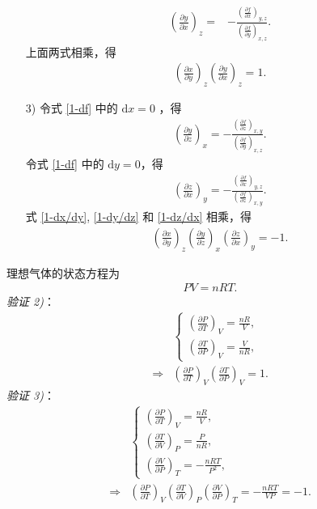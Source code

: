\documentclass{assignment}
\begin{document}
\begin{pf}
\begin{itemize}
\begin{align}
            \left(\frac{\partial y}{\partial x}\right)_z=&-\frac{\left(\frac{\partial f}{\partial x}\right)_{y,z}}{\left(\frac{\partial f}{\partial y}\right)_{x,z}}.
        \end{align}
        上面两式相乘，得
        \begin{align}
            \left(\frac{\partial x}{\partial y}\right)_z\left(\frac{\partial y}{\partial x}\right)_z=1.
        \end{align}
        \item[3)] 令式 \eqref{1-df} 中的 $\mathrm{d}x=0$ ，得
        \begin{align}
            \label{1-dy/dz}
            \left(\frac{\partial y}{\partial z}\right)_x=-\frac{\left(\frac{\partial f}{\partial z}\right)_{x,y}}{\left(\frac{\partial f}{\partial y}\right)_{x,z}}.
        \end{align}
        令式 \eqref{1-df} 中的 $\mathrm{d}y=0$，得
        \begin{align}
            \label{1-dz/dx}
            \left(\frac{\partial z}{\partial x}\right)_y=-\frac{\left(\frac{\partial f}{\partial x}\right)_{y,z}}{\left(\frac{\partial f}{\partial z}\right)_{x,y}}.
        \end{align}
        式 \eqref{1-dx/dy}, \eqref{1-dy/dz} 和 \eqref{1-dz/dx} 相乘，得
        \begin{align}
            \left(\frac{\partial x}{\partial y}\right)_z\left(\frac{\partial y}{\partial z}\right)_x\left(\frac{\partial z}{\partial x}\right)_y=-1.
        \end{align}
    \end{itemize}

    理想气体的状态方程为
    \begin{align}
        PV=nRT.
    \end{align}
    \emph{验证 2)}：
    \begin{align}
        &\left\{\begin{array}{l}
            \left(\frac{\partial P}{\partial T}\right)_V=\frac{nR}{V},\\
            \left(\frac{\partial T}{\partial P}\right)_V=\frac{V}{nR},
        \end{array}\right.\\
        \Longrightarrow&\left(\frac{\partial P}{\partial T}\right)_V\left(\frac{\partial T}{\partial P}\right)_V=1.
    \end{align}
    \emph{验证 3)}：
    \begin{align}
        &\left\{\begin{array}{l}
            \left(\frac{\partial P}{\partial T}\right)_V=\frac{nR}{V},\\
            \left(\frac{\partial T}{\partial V}\right)_P=\frac{P}{nR},\\
            \left(\frac{\partial V}{\partial P}\right)_T=-\frac{nRT}{P^2},
        \end{array}\right.\\
        \Longrightarrow&\left(\frac{\partial P}{\partial T}\right)_V\left(\frac{\partial T}{\partial V}\right)_P\left(\frac{\partial V}{\partial P}\right)_T=-\frac{nRT}{VP}=-1.
    \end{align}
\end{pf}
\end{document}
